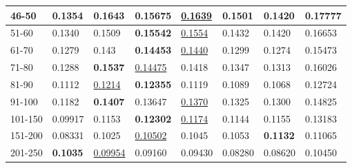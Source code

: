 \begin{table*}[]
\begin{tabular}{|l|l|l|l|l|l|l||l|}
        46-50     & 0.1354                         & \textbf{0.1643}                & 0.15675                        & \underline{0.1639}             & 0.1501                         & 0.1420                          & 0.17777                    \\ \hline
        51-60     & 0.1340                         & 0.1509                         & \textbf{0.15542}               & \underline{0.1554}             & 0.1432                         & 0.1420                          & 0.16653                    \\ \hline
        61-70     & 0.1279                         & 0.143                          & \textbf{0.14453}               & \underline{0.1440}             & 0.1299                         & 0.1274                          & 0.15473                    \\ \hline
        71-80     & 0.1288                         & \textbf{0.1537}                & \underline{0.14475}            & 0.1418                         & 0.1347                         & 0.1313                          & 0.16026                    \\ \hline
        81-90     & 0.1112                         & \underline{0.1214}             & \textbf{0.12355}               & 0.1119                         & 0.1089                         & 0.1068                          & 0.12724                    \\ \hline
        91-100    & 0.1182                         & \textbf{0.1407}                & 0.13647                        & \underline{0.1370}             & 0.1325                         & 0.1300                          & 0.14825                    \\ \hline
        101-150   & 0.09917                        & 0.1153                         & \textbf{0.12302}               & \underline{0.1174}             & 0.1144                         & 0.1155                          & 0.13183                    \\ \hline
        151-200   & 0.08331                        & 0.1025                         & \underline{0.10502}            & 0.1045                         & 0.1053                         & \textbf{0.1132}                 & 0.11065                    \\ \hline
        201-250   & \textbf{0.1035}                & \underline{0.09954}            & 0.09160                        & 0.09430                        & 0.08280                        & 0.08620                         & 0.10450                    \\ \hline

\end{tabular}
\end{table*}
